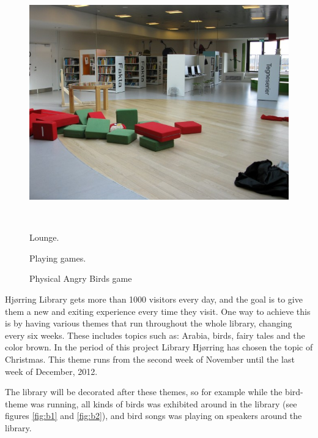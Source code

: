 \begin{figure}[htbp]
\begin{minipage}[b]{0.3\textwidth}
		\includegraphics[width=1.00\textwidth]{Pictures/HjoerringLibrary/p3.jpg} %
	\end{minipage}\\ %
	\begin{minipage}[t]{0.3\textwidth}
		\caption{Lounge.} %
		\label{fig:p1}
	\end{minipage}\hfill
	\begin{minipage}[t]{0.3\textwidth}
		\caption{Playing games.} %
		\label{fig:p2}
	\end{minipage}\hfill	
	\begin{minipage}[t]{0.3\textwidth}
		\caption{Physical Angry Birds game} %
		\label{fig:p3}
	\end{minipage}
\end{figure}

Hj{\o}rring Library gets more than 1000 visitors every day, and the goal is to give them a new and exiting experience every time they visit. One way to achieve this is by having various themes that run throughout the whole library, changing every six weeks. These includes topics such as: Arabia, birds, fairy tales and the color brown. In the period of this project Library Hj{\o}rring has chosen the topic of Christmas. This theme runs from the second week of November until the last week of December, 2012.

The library will be decorated after these themes, so for example while the bird-theme was running, all kinds of birds was exhibited around in the library (see figures \ref{fig:b1} and \ref{fig:b2}), and bird songs was playing on speakers around the library.

